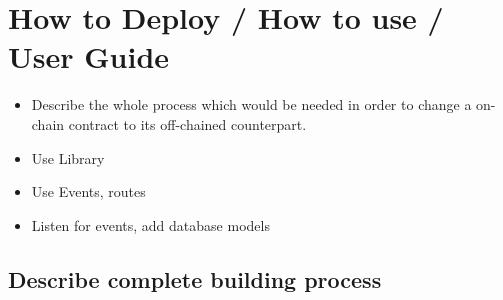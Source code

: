 \section{How to Deploy / How to use / User Guide}



\begin{itemize}
\item Describe the whole process which would be needed in order to change a on-chain contract to its off-chained counterpart.
\item Use Library
\item Use Events, routes
\item Listen for events, add database models
\end{itemize}

\subsection{Describe complete building process}